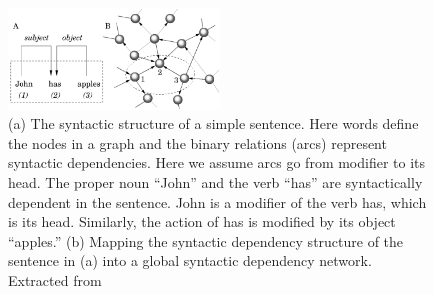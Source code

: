 \begin{figure}
    \centering
    \includegraphics[width=0.5\textwidth]{figures/sdn.png}
    \caption{(a) The syntactic structure of a simple sentence. Here words define the nodes in a graph and the binary relations (arcs) represent syntactic dependencies. Here we assume arcs go from modifier to its head. The proper noun “John” and the verb “has” are syntactically dependent in the sentence. John is a modifier of the verb has, which is its head. Similarly, the action of has is modified by its object “apples.” (b) Mapping the syntactic dependency structure of the sentence in (a) into a global syntactic dependency network. Extracted from \cite{i2004patterns}}
    \label{fig:sdn}
\end{figure}